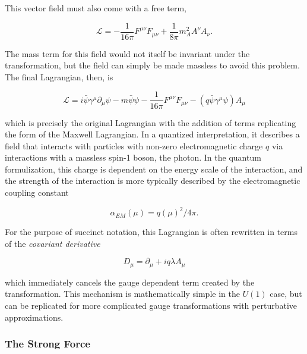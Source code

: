 This vector field must also come with a free term, 

\begin{equation}
\mathcal{L} = -\frac{1}{16\pi}F^{\mu\nu}F_{\mu\nu} + \frac{1}{8\pi}m_A^2A^\nu A_\nu . 
\end{equation}

The mass term for this field would not itself be invariant under the transformation, but the field can simply be made massless to avoid this problem. The final Lagrangian, then, is 

\begin{equation}
\mathcal{L} = i\bar{\psi}\gamma^\mu \partial_\mu\psi - m \bar{\psi}\psi -\frac{1}{16\pi}F^{\mu\nu}F_{\mu\nu} - (q\bar{\psi}\gamma^\mu\psi)A_\mu
\label{eq:l_em}
\end{equation}

which is precisely the original Lagrangian with the addition of terms replicating the form of the Maxwell Lagrangian. In a quantized interpretation, it describes a field that interacts with particles with non-zero electromagnetic charge $q$ via interactions with a massless spin-1 boson, the photon. In the quantum formulization, this charge is dependent on the energy scale of the interaction, and the strength of the interaction is more typically described by the electromagnetic coupling constant

\begin{equation}
\alpha_{EM}(\mu) =  q(\mu)^2 / 4\pi . 
\end{equation}

For the purpose of succinct notation, this Lagrangian is often rewritten in terms of the \textit{covariant derivative}

\begin{equation}
D_\mu = \partial_\mu + iq\lambda A_\mu
\end{equation}

which immediately cancels the gauge dependent term created by the transformation. This mechanism is mathematically simple in the $U(1)$ case, but can be replicated for more complicated gauge transformations with perturbative approximations. 


\subsubsection{The Strong Force}
\label{sec:strong}

